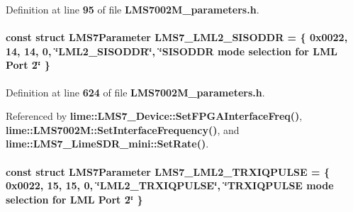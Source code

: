 Definition at line {\bf 95} of file {\bf L\+M\+S7002\+M\+\_\+parameters.\+h}.

\paragraph[{L\+M\+S7\+\_\+\+L\+M\+L2\+\_\+\+S\+I\+S\+O\+D\+DR}]{\setlength{\rightskip}{0pt plus 5cm}const struct {\bf L\+M\+S7\+Parameter} L\+M\+S7\+\_\+\+L\+M\+L2\+\_\+\+S\+I\+S\+O\+D\+DR = \{ 0x0022, 14, 14, 0, \char`\"{}\+L\+M\+L2\+\_\+\+S\+I\+S\+O\+D\+D\+R\char`\"{}, \char`\"{}\+S\+I\+S\+O\+D\+D\+R mode selection for L\+M\+L Port 2\char`\"{} \}\hspace{0.3cm}{\ttfamily [static]}}\label{LMS7002M__parameters_8h_a8eb7d6008e15354ac9e6be87c5133d54}


Definition at line {\bf 624} of file {\bf L\+M\+S7002\+M\+\_\+parameters.\+h}.



Referenced by {\bf lime\+::\+L\+M\+S7\+\_\+\+Device\+::\+Set\+F\+P\+G\+A\+Interface\+Freq()}, {\bf lime\+::\+L\+M\+S7002\+M\+::\+Set\+Interface\+Frequency()}, and {\bf lime\+::\+L\+M\+S7\+\_\+\+Lime\+S\+D\+R\+\_\+mini\+::\+Set\+Rate()}.

\paragraph[{L\+M\+S7\+\_\+\+L\+M\+L2\+\_\+\+T\+R\+X\+I\+Q\+P\+U\+L\+SE}]{\setlength{\rightskip}{0pt plus 5cm}const struct {\bf L\+M\+S7\+Parameter} L\+M\+S7\+\_\+\+L\+M\+L2\+\_\+\+T\+R\+X\+I\+Q\+P\+U\+L\+SE = \{ 0x0022, 15, 15, 0, \char`\"{}\+L\+M\+L2\+\_\+\+T\+R\+X\+I\+Q\+P\+U\+L\+S\+E\char`\"{}, \char`\"{}\+T\+R\+X\+I\+Q\+P\+U\+L\+S\+E mode selection for L\+M\+L Port 2\char`\"{} \}\hspace{0.3cm}{\ttfamily [static]}}\label{LMS7002M__parameters_8h_ae6c38736279b0bce4ff18b0f20039583}


